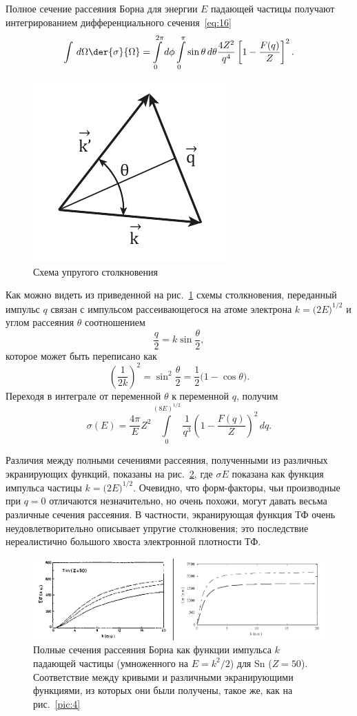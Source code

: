 \documentclass[10pt,pscyr]{hedlab}
\newcommand{\eq}  [1]{\eqref{eq:#1}}
\newcommand{\pic} [1]{\ref{pic:#1}}
\begin{document}
  Полное сечение рассеяния Борна для энергии \( E \) падающей частицы получают
  интегрированием дифференциального сечения~\eq{16} 
  \[
    \int\,d\Omega\der{\sigma}{\Omega} = \int\limits_0^{2\pi} d\phi
      \int\limits_0^\pi \sin\theta\,d\theta \frac{4Z^2}{q^4}
      \left[1 - \frac{F(q)}{Z}\right]^2.
  \]
  
  \begin{figure}[htb!]
    \center
    \includegraphics[width=.3\textwidth]{pic_6}
    \caption{Схема упругого столкновения}
    \label{pic:6}
  \end{figure}
  
  Как можно видеть из приведенной на рис.~\pic{6} схемы столкновения,
  переданный импульс \( q \) связан с импульсом рассеивающегося на атоме
  электрона \( k = \bigl(2E\big)^{1/2} \) и углом рассеяния \( \theta \)
  соотношением
  \[
    \frac{q}{2} = k\sin\frac{\theta}{2},
  \]
  которое может быть переписано как
  \[
    \left(\frac{1}{2k}\right)^2 = \sin^2\frac{\theta}{2} = \frac{1}{2}
      \bigl(1 - \cos\theta\big).
  \]
  Переходя в интеграле от переменной \( \theta \) к переменной \( q \), получим
  \[
    \sigma(E) = \frac{4\pi}{E}Z^2 \int\limits_0^{(8E)^{1/2}} \frac{1}{q^3}
      \left(1 - \frac{F(q)}{Z}\right)^2\,dq.
  \]

  Различия между полными сечениями рассеяния, полученными из различных
  экранирующих функций, показаны на рис.~\pic{7}, где \( \sigma E \) показана
  как функция импульса частицы \( k = \bigl(2E\big)^{1/2} \). Очевидно,
  что форм-факторы, чьи производные при \( q = 0 \) отличаются незначительно,
  но очень похожи, могут давать весьма различные сечения рассеяния. В
  частности, экранирующая функция ТФ очень неудовлетворительно описывает
  упругие столкновения; это последствие нереалистично большого хвоста
  электронной плотности ТФ.
  
  \begin{figure}[htb!]
    \center
    \includegraphics[width=.7\textwidth]{pic_7}
    \caption{Полные сечения рассеяния Борна как функции импульса \( k \)
      падающей частицы (умноженного на \( E = k^2 / 2 \)) для Sn (\( Z = 50 \)).
      Соответствие между кривыми и различными экранирующими функциями, из
      которых они были получены, такое же, как на рис.~\pic{4}}
    \label{pic:7}
  \end{figure}
  
\end{document}
